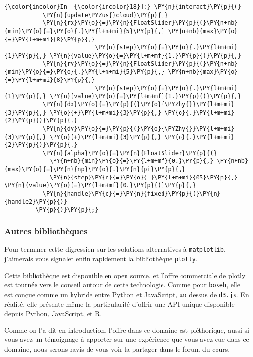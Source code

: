     \begin{Verbatim}[commandchars=\\\{\},frame=single,framerule=0.3mm,rulecolor=\color{cellframecolor}]
{\color{incolor}In [{\color{incolor}18}]:} \PY{n}{interact}\PY{p}{(}
           \PY{n}{update\PYZus{}cloud}\PY{p}{,}
           \PY{n}{rx}\PY{o}{=}\PY{n}{FloatSlider}\PY{p}{(}\PY{n+nb}{min}\PY{o}{=}\PY{o}{.}\PY{l+m+mi}{5}\PY{p}{,} \PY{n+nb}{max}\PY{o}{=}\PY{l+m+mi}{8}\PY{p}{,}
                          \PY{n}{step}\PY{o}{=}\PY{o}{.}\PY{l+m+mi}{1}\PY{p}{,} \PY{n}{value}\PY{o}{=}\PY{l+m+mf}{1.}\PY{p}{)}\PY{p}{,}
           \PY{n}{ry}\PY{o}{=}\PY{n}{FloatSlider}\PY{p}{(}\PY{n+nb}{min}\PY{o}{=}\PY{o}{.}\PY{l+m+mi}{5}\PY{p}{,} \PY{n+nb}{max}\PY{o}{=}\PY{l+m+mi}{8}\PY{p}{,}
                          \PY{n}{step}\PY{o}{=}\PY{o}{.}\PY{l+m+mi}{1}\PY{p}{,} \PY{n}{value}\PY{o}{=}\PY{l+m+mf}{1.}\PY{p}{)}\PY{p}{,}
           \PY{n}{dx}\PY{o}{=}\PY{p}{(}\PY{o}{\PYZhy{}}\PY{l+m+mi}{3}\PY{p}{,} \PY{o}{+}\PY{l+m+mi}{3}\PY{p}{,} \PY{o}{.}\PY{l+m+mi}{2}\PY{p}{)}\PY{p}{,}
           \PY{n}{dy}\PY{o}{=}\PY{p}{(}\PY{o}{\PYZhy{}}\PY{l+m+mi}{3}\PY{p}{,} \PY{o}{+}\PY{l+m+mi}{3}\PY{p}{,} \PY{o}{.}\PY{l+m+mi}{2}\PY{p}{)}\PY{p}{,}
           \PY{n}{alpha}\PY{o}{=}\PY{n}{FloatSlider}\PY{p}{(}
             \PY{n+nb}{min}\PY{o}{=}\PY{l+m+mf}{0.}\PY{p}{,} \PY{n+nb}{max}\PY{o}{=}\PY{n}{np}\PY{o}{.}\PY{n}{pi}\PY{p}{,}
             \PY{n}{step}\PY{o}{=}\PY{o}{.}\PY{l+m+mi}{05}\PY{p}{,} \PY{n}{value}\PY{o}{=}\PY{l+m+mf}{0.}\PY{p}{)}\PY{p}{,}
           \PY{n}{handle}\PY{o}{=}\PY{n}{fixed}\PY{p}{(}\PY{n}{handle2}\PY{p}{)}
         \PY{p}{)}\PY{p}{;}
\end{Verbatim}


    \hypertarget{autres-bibliothuxe8ques}{%
\subsubsection{Autres bibliothèques}\label{autres-bibliothuxe8ques}}

    Pour terminer cette digression sur les solutions alternatives à
\texttt{matplotlib}, j'aimerais vous signaler enfin rapidement
\href{https://plot.ly/}{la bibliothèque \texttt{plotly}}.

Cette bibliothèque est disponible en open source, et l'offre commerciale
de plotly est tournée vers le conseil autour de cette technologie. Comme
pour \texttt{bokeh}, elle est conçue comme un hybride entre Python et
JavaScript, au dessus de \texttt{d3.js}. En réalité, elle présente même
la particularité d'offrir une API unique disponible depuis Python,
JavaScript, et R.

    Comme on l'a dit en introduction, l'offre dans ce domaine est
pléthorique, aussi si vous avez un témoignage à apporter sur une
expérience que vous avez eue dans ce domaine, nous serons ravis de vous
voir la partager dans le forum du cours.


    
    
    
